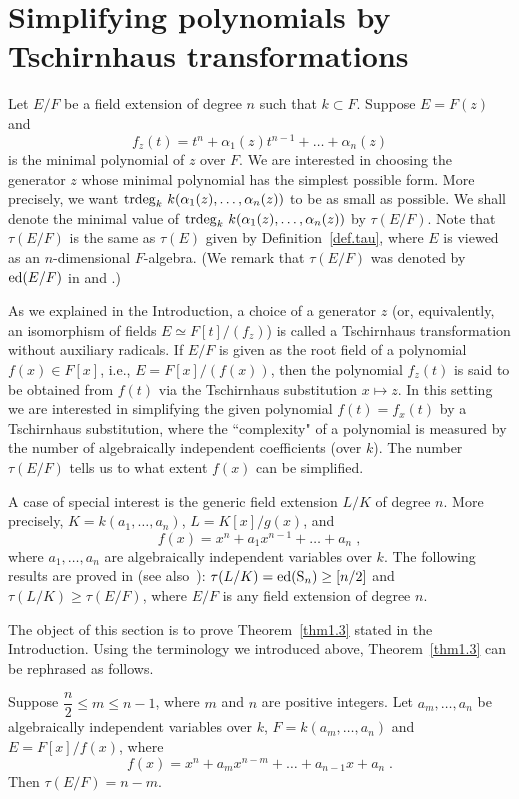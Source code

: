 \section{Simplifying polynomials by Tschirnhaus transformations}
\label{sect9}

Let $E/F$ be a field extension of degree $n$ such that $k \subset F$.
Suppose $E = F(z)$ and 
$$ f_z(t) = t^n + \alpha_1(z)t^{n-1} + \ldots + \alpha_n(z) $$
is the minimal polynomial of $z$ over $F$. 
We are interested in choosing the generator $z$ whose minimal polynomial
has the simplest possible form. More precisely, we want 
$\operatorname{trdeg}_k \, k(\alpha_1(z), \ldots, \alpha_n(z))$ to be as small 
as possible. We shall denote the minimal value of 
$\operatorname{trdeg}_k \, k(\alpha_1(z), \ldots, \alpha_n(z))$ by $\tau(E/F)$.  Note that
$\tau(E/F)$ is the same as $\tau(E)$ given by Definition~\ref{def.tau},
where $E$ is viewed as an $n$-dimensional $F$-algebra.  (We remark 
that $\tau(E/F)$ was denoted by $\operatorname{ed}(E/F)$ in \cite{br1} and \cite{br2}.)

As we explained in the Introduction, a choice of a generator
$z$ (or, equivalently, an isomorphism of fields $E \simeq F[t]/(f_z)$)
is called a Tschirnhaus transformation without auxiliary radicals.
If $E/F$ is given as the root field of a polynomial $f(x) \in F[x]$, i.e.,
$E = F[x]/(f(x))$, then the polynomial $f_z(t)$ is said to be obtained
from $f(t)$ via the Tschirnhaus substitution $x \longmapsto z$. In this setting
we are interested in simplifying the given polynomial $f(t) = f_x(t)$ 
by a Tschirnhaus substitution, where the ``complexity" of a polynomial 
is measured by the
number of algebraically independent coefficients (over $k$). The number 
$\tau(E/F)$ tells us to what extent $f(x)$ can be simplified.

A case of special interest is the generic field extension $L/K$ of degree $n$.
More precisely, $K = k(a_1, \ldots, a_n)$, $L = K[x]/g(x)$, and
\[ f(x) = x^n + a_1 x^{n-1} + \ldots + a_n \; , \]
where $a_1, \ldots, a_n$ are algebraically independent variables over $k$.
The following results are proved in \cite{br1} (see also~\cite{br2}):
$\tau(L/K) = \operatorname{ed}({\operatorname{S}}_n) \geq [n/2]$ and
$\tau(L/K) \geq \tau(E/F)$, where $E/F$ is any field extension 
of degree $n$.  

The object of this section is to prove Theorem~\ref{thm1.3} stated in the
Introduction. Using the terminology we introduced above,
Theorem~\ref{thm1.3} can be rephrased as follows.

\begin{thm} \label{thm7.1}
Suppose $\dfrac{n}{2} \leq m \leq n-1$, where $m$ and $n$ are positive
integers. 
Let $a_m, \dots, a_n$ be algebraically independent variables over $k$,
$F = k(a_m, \ldots, a_n)$ and $E = F[x]/f(x)$, where 
$$f(x) = x^n + a_m x^{n-m} + \dots + a_{n-1} x + a_n \; . $$
Then $\tau(E/F) = n-m$. 
\end{thm}

